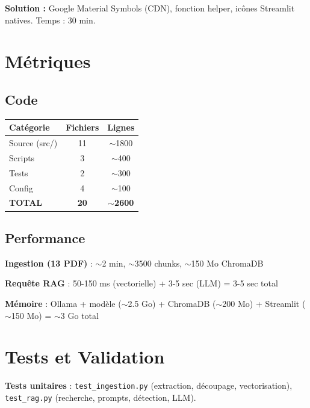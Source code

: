 \documentclass[12pt,a4paper]{report}
\begin{document}
\textbf{Solution :} Google Material Symbols (CDN), fonction helper, icônes Streamlit natives. Temps : 30 min.

\chapter{Métriques}

\section{Code}

\begin{table}[H]
    \centering
    \begin{tabular}{|l|c|c|}
        \hline
        \rowcolor{green!20}
        \textbf{Catégorie} & \textbf{Fichiers} & \textbf{Lignes} \\
        \hline
        Source (src/) & 11 & $\sim$1800 \\
        \hline
        Scripts & 3 & $\sim$400 \\
        \hline
        Tests & 2 & $\sim$300 \\
        \hline
        Config & 4 & $\sim$100 \\
        \hline
        \rowcolor{green!10}
        \textbf{TOTAL} & \textbf{20} & $\sim$\textbf{2600} \\
        \hline
    \end{tabular}
\end{table}

\section{Performance}

\textbf{Ingestion (13 PDF)} : $\sim$2 min, $\sim$3500 chunks, $\sim$150 Mo ChromaDB

\textbf{Requête RAG} : 50-150 ms (vectorielle) + 3-5 sec (LLM) = 3-5 sec total

\textbf{Mémoire} : Ollama + modèle ($\sim$2.5 Go) + ChromaDB ($\sim$200 Mo) + Streamlit ($\sim$150 Mo) = $\sim$3 Go total

\chapter{Tests et Validation}

\textbf{Tests unitaires} : \texttt{test\_ingestion.py} (extraction, découpage, vectorisation), \texttt{test\_rag.py} (recherche, prompts, détection, LLM).
\end{document}
